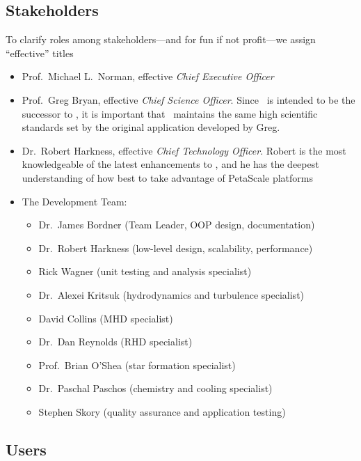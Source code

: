 \documentclass{article}
\begin{document}
\subsection{Stakeholders}

To clarify roles among stakeholders---and for fun if not profit---we
assign ``effective'' titles

\begin{itemize}
%
 \item  Prof.~Michael L.~Norman, effective \textit{Chief Executive Officer}
%
 \item Prof.~Greg Bryan, effective \textit{Chief Science Officer}.
 Since \cello\ is intended to be the successor to \enzo, it is
 important that \cello\ maintains the same high scientific standards
 set by the original application developed by Greg.
%
 \item Dr.~Robert Harkness, effective \textit{Chief Technology
 Officer}.  Robert is the most knowledgeable of the latest enhancements to
 \enzo, and he has the deepest understanding of how best to take advantage of
 PetaScale platforms
%
\item The Development Team:
\begin{itemize}
\item Dr.~James Bordner (Team Leader, OOP design, documentation)
\item Dr.~Robert Harkness (low-level design, scalability, performance)
\item Rick Wagner (unit testing and analysis specialist)
\item Dr.~Alexei Kritsuk (hydrodynamics and turbulence specialist)
\item David Collins (MHD specialist)
\item Dr.~Dan Reynolds (RHD specialist)
\item Prof.~Brian O'Shea (star formation specialist)
\item Dr.~Paschal Paschos (chemistry and cooling specialist)
\item Stephen Skory (quality assurance and application testing)
\end{itemize}
\end{itemize}
    

\subsection{Users}
\end{document}
